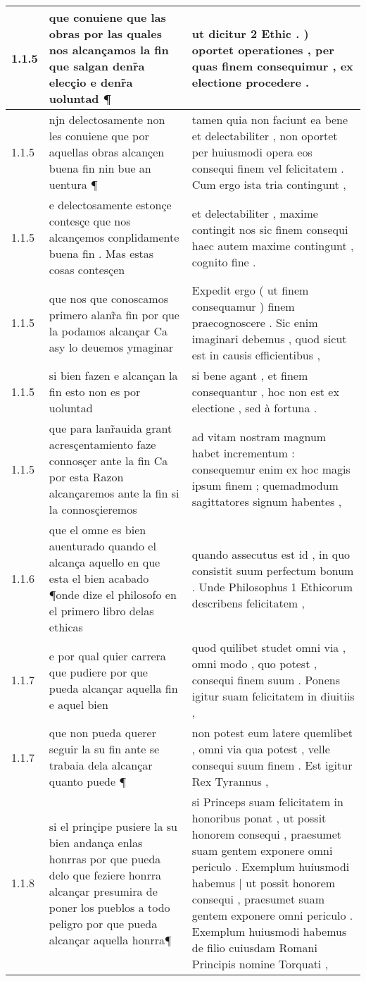 \begin{tabular}{|p{1cm}|p{6.5cm}|p{6.5cm}|}
1.1.5 & que conuiene que las obras por las quales nos alcançamos la fin que salgan denr̃a elecçio e denr̃a uoluntad ¶ & ut dicitur 2 Ethic . ) oportet operationes , per quas finem consequimur , ex electione procedere . \\\hline
1.1.5 & njn delectosamente non les conuiene que por aquellas obras alcançen buena fin nin bue an uentura ¶ & tamen quia non faciunt ea bene et delectabiliter , non oportet per huiusmodi opera eos consequi finem vel felicitatem . Cum ergo ista tria contingunt , \\\hline
1.1.5 & e delectosamente estonçe contesçe que nos alcançemos conplidamente buena fin . Mas estas cosas contesçen & et delectabiliter , maxime contingit nos sic finem consequi haec autem maxime contingunt , cognito fine . \\\hline
1.1.5 & que nos que conoscamos primero alanr̃a fin por que la podamos alcançar Ca asy lo deuemos ymaginar & Expedit ergo ( ut finem consequamur ) finem praecognoscere . Sic enim imaginari debemus , quod sicut est in causis efficientibus , \\\hline
1.1.5 & si bien fazen e alcançan la fin esto non es por uoluntad & si bene agant , et finem consequantur , hoc non est ex electione , sed à fortuna . \\\hline
1.1.5 & que para lanr̃auida grant acresçentamiento faze connosçer ante la fin Ca por esta Razon alcançaremos ante la fin si la connosçieremos & ad vitam nostram magnum habet incrementum : consequemur enim ex hoc magis ipsum finem ; quemadmodum sagittatores signum habentes , \\\hline
1.1.6 & que el omne es bien auenturado quando el alcança aquello en que esta el bien acabado ¶onde dize el philosofo en el primero libro delas ethicas & quando assecutus est id , in quo consistit suum perfectum bonum . Unde Philosophus 1 Ethicorum describens felicitatem , \\\hline
1.1.7 & e por qual quier carrera que pudiere por que pueda alcançar aquella fin e aquel bien & quod quilibet studet omni via , omni modo , quo potest , consequi finem suum . Ponens igitur suam felicitatem in diuitiis , \\\hline
1.1.7 & que non pueda querer seguir la su fin ante se trabaia dela alcançar quanto puede ¶ & non potest eum latere quemlibet , omni via qua potest , velle consequi suum finem . Est igitur Rex Tyrannus , \\\hline
1.1.8 & si el prinçipe pusiere la su bien andança enlas honrras por que pueda delo que feziere honrra alcançar presumira de poner los pueblos a todo peligro por que pueda alcançar aquella honrra¶ & si Princeps suam felicitatem in honoribus ponat , ut possit honorem consequi , praesumet suam gentem exponere omni periculo . Exemplum huiusmodi habemus | ut possit honorem consequi , praesumet suam gentem exponere omni periculo . Exemplum huiusmodi habemus de filio cuiusdam Romani Principis nomine Torquati , \\\hline

\end{tabular}
